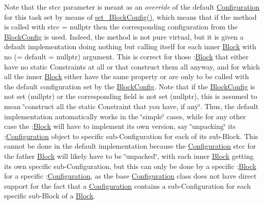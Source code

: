 Note that the stcc parameter is meant as an {\itshape override} of the default \mbox{\hyperlink{class_s_m_spp__di__unipi__it_1_1_configuration}{Configuration}} for this task set by means of \mbox{\hyperlink{class_s_m_spp__di__unipi__it_1_1_block_a18d411b740a47db00d15083c5c7ef2ba}{set\+\_\+\+Block\+Config()}}, which means that if the method is called with stcc = nullptr then the corresponding configuration from the \mbox{\hyperlink{class_s_m_spp__di__unipi__it_1_1_block_config}{Block\+Config}} is used. Indeed, the method is not pure virtual, but it is given a default implementation doing nothing but calling itself for each inner \mbox{\hyperlink{class_s_m_spp__di__unipi__it_1_1_block}{Block}} with no (= default = nullptr) argument. This is correct for those \+:\mbox{\hyperlink{class_s_m_spp__di__unipi__it_1_1_block}{Block}} that either have no static Constraints at all or that construct them all anyway, and for which all the inner \mbox{\hyperlink{class_s_m_spp__di__unipi__it_1_1_block}{Block}} either have the same property or are only to be called with the default configuration set by the \mbox{\hyperlink{class_s_m_spp__di__unipi__it_1_1_block_config}{Block\+Config}}. Note that if the \mbox{\hyperlink{class_s_m_spp__di__unipi__it_1_1_block_config}{Block\+Config}} is not set (nullptr) or the corresponding field is not set (nullptr), this is assumed to mean \char`\"{}construct all the static
\+Constraint that you have, if any\char`\"{}. Thus, the default implementation automatically works in the \char`\"{}simple\char`\"{} cases, while for any other case the \+:\mbox{\hyperlink{class_s_m_spp__di__unipi__it_1_1_block}{Block}} will have to implement its own version, say \char`\"{}unpacking\char`\"{} its \+:\mbox{\hyperlink{class_s_m_spp__di__unipi__it_1_1_configuration}{Configuration}} object to specific sub-\/\+Configuration for each of its sub-\/\+Block. This cannot be done in the default implementation because the \mbox{\hyperlink{class_s_m_spp__di__unipi__it_1_1_configuration}{Configuration}} stcc for the father \mbox{\hyperlink{class_s_m_spp__di__unipi__it_1_1_block}{Block}} will likely have to be \char`\"{}unpacked\char`\"{}, with each inner \mbox{\hyperlink{class_s_m_spp__di__unipi__it_1_1_block}{Block}} getting its own specific sub-\/\+Configuration, but this can only be done by a specific \+:\mbox{\hyperlink{class_s_m_spp__di__unipi__it_1_1_block}{Block}} for a specific \+:\mbox{\hyperlink{class_s_m_spp__di__unipi__it_1_1_configuration}{Configuration}}, as the base \mbox{\hyperlink{class_s_m_spp__di__unipi__it_1_1_configuration}{Configuration}} class does not have direct support for the fact that a \mbox{\hyperlink{class_s_m_spp__di__unipi__it_1_1_configuration}{Configuration}} contains a sub-\/\+Configuration for each specific sub-\/\+Block of a \mbox{\hyperlink{class_s_m_spp__di__unipi__it_1_1_block}{Block}}. 

